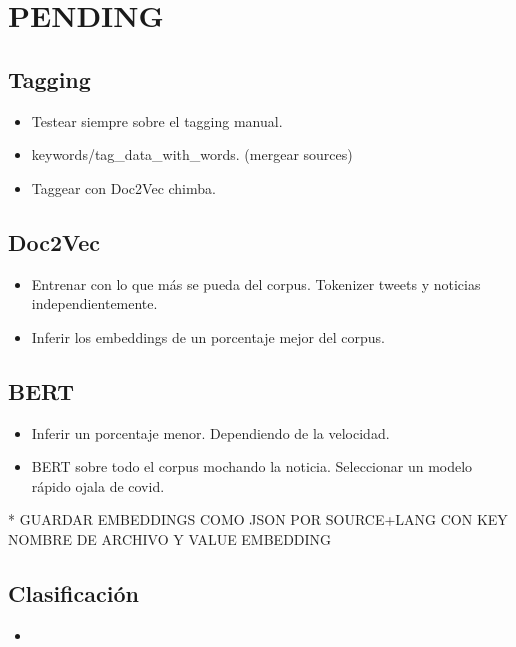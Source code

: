 \documentclass[12pt]{article}
\begin{document}
\thispagestyle{empty}
\tableofcontents
\pagebreak

\setcounter{page}{1}









\section{PENDING}

\subsection{Tagging}
\begin{itemize}
    \item Testear siempre sobre el tagging manual.
    \item keywords/tag\_data\_with\_words. (mergear sources)
    \item Taggear con Doc2Vec chimba.
\end{itemize}

\subsection{Doc2Vec}
\begin{itemize}
    \item Entrenar con lo que más se pueda del corpus. Tokenizer tweets y noticias independientemente.
    \item Inferir los embeddings de un porcentaje mejor del corpus.
\end{itemize}

\subsection{BERT}
\begin{itemize}
    \item Inferir un porcentaje menor. Dependiendo de la velocidad.
    \item BERT sobre todo el corpus mochando la noticia. Seleccionar un modelo rápido ojala de covid.
\end{itemize}
* GUARDAR EMBEDDINGS COMO JSON POR SOURCE+LANG CON KEY NOMBRE DE ARCHIVO Y VALUE EMBEDDING
\subsection{Clasificación}
\begin{itemize}
    \item 
\end{itemize}
\end{document}
